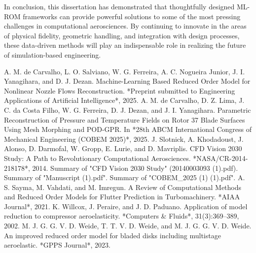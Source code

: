 \documentclass[12pt, a4paper]{report}
\begin{document}
In conclusion, this dissertation has demonstrated that thoughtfully designed ML-ROM frameworks can provide powerful solutions to some of the most pressing challenges in computational aerosciences. By continuing to innovate in the areas of physical fidelity, geometric handling, and integration with design processes, these data-driven methods will play an indispensable role in realizing the future of simulation-based engineering.


\begin{thebibliography}{99}
     A. M. de Carvalho, L. O. Salviano, W. G. Ferreira, A. C. Nogueira Junior, J. I. Yanagihara, and D. J. Dezan. Machine-Learning Based Reduced Order Model for Nonlinear Nozzle Flows Reconstruction. *Preprint submitted to Engineering Applications of Artificial Intelligence*, 2025.
     A. M. de Carvalho, D. Z. Lima, J. C. da Costa Filho, W. G. Ferreira, D. J. Dezan, and J. I. Yanagihara. Parametric Reconstruction of Pressure and Temperature Fields on Rotor 37 Blade Surfaces Using Mesh Morphing and POD-GPR. In *28th ABCM International Congress of Mechanical Engineering (COBEM 2025)*, 2025.
     J. Slotnick, A. Khodadoust, J. Alonso, D. Darmofal, W. Gropp, E. Lurie, and D. Mavriplis. CFD Vision 2030 Study: A Path to Revolutionary Computational Aerosciences. *NASA/CR-2014-218178*, 2014.
     Summary of "CFD Vision 2030 Study" (20140003093 (1).pdf).
     Summary of "Manuscript (1).pdf".
     Summary of "COBEM\_2025 (1) (1).pdf".
     A. S. Sayma, M. Vahdati, and M. Imregun. A Review of Computational Methods and Reduced Order Models for Flutter Prediction in Turbomachinery. *AIAA Journal*, 2021.
     K. Willcox, J. Peraire, and J. D. Paduano. Application of model reduction to compressor aeroelasticity. *Computers \& Fluids*, 31(3):369–389, 2002.
     M. J. G. G. V. D. Weide, T. T. V. D. Weide, and M. J. G. G. V. D. Weide. An improved reduced order model for bladed disks including multistage aeroelastic. *GPPS Journal*, 2023.

\end{thebibliography}
\end{document}
